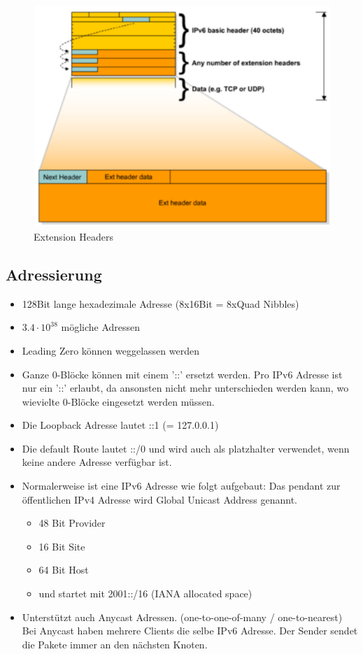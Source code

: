 \begin{figure}[h]
	\centering
	\includegraphics[width=0.5\linewidth]{images/extension_header.pdf}
	\caption{Extension Headers}
\end{figure}

\subsection{Adressierung}
\begin{itemize}
	\item 128Bit lange hexadezimale Adresse (8x16Bit = 8xQuad Nibbles)
	\item $3.4 \cdot 10^{38}$ mögliche Adressen
	\item Leading Zero können weggelassen werden
	\item Ganze 0-Blöcke können mit einem '::' ersetzt werden. Pro IPv6 Adresse ist nur ein '::' erlaubt, da ansonsten nicht mehr unterschieden werden kann, wo wievielte 0-Blöcke eingesetzt werden müssen.
	\item Die Loopback Adresse lautet ::1 (= 127.0.0.1)
	\item Die default Route lautet ::/0 und wird auch als platzhalter verwendet, wenn keine andere Adresse verfügbar ist. 
	\item Normalerweise ist eine IPv6 Adresse wie folgt aufgebaut: Das pendant zur öffentlichen IPv4 Adresse wird Global Unicast Address genannt.
	\begin{itemize}
		\item 48 Bit Provider
		\item 16 Bit Site
		\item 64 Bit Host
		\item und startet mit 2001::/16 (IANA allocated space)
	\end{itemize}
	\item Unterstützt auch Anycast Adressen. (one-to-one-of-many / one-to-nearest) Bei Anycast haben mehrere Clients die selbe IPv6 Adresse. Der Sender sendet die Pakete immer an den nächsten Knoten.
\end{itemize}

